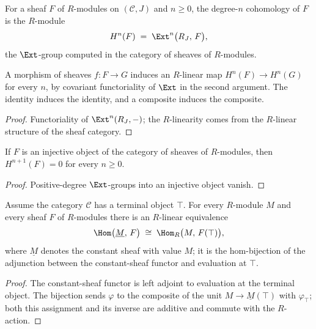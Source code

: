 \begin{definition}
  \label{def:HModule}
  \leanok
  For a sheaf \(F\) of \(R\)-modules on \((\mathcal C, J)\) and \(n \ge 0\), the degree-\(n\)
  cohomology of \(F\) is the \(R\)-module
  \[
    H^n(F) \;=\; \Ext^n\bigl(R_J,\, F\bigr),
  \]
  the \(\Ext\)-group computed in the category of sheaves of \(R\)-modules.
\end{definition}

\begin{definition}[Functoriality]
  \label{def:HModule_map}
  \leanok
  A morphism of sheaves \(f : F \to G\) induces an \(R\)-linear map
  \(H^n(F) \to H^n(G)\) for every \(n\), by covariant functoriality of \(\Ext\) in the second
  argument. The identity induces the identity, and a composite induces the composite.
\end{definition}
\begin{proof}
  \leanok
  Functoriality of \(\Ext^n(R_J, -)\); the \(R\)-linearity comes from the \(R\)-linear
  structure of the sheaf category.
\end{proof}

\begin{lemma}
  \label{lem:HModule_injective_vanishing}
  \leanok
  If \(F\) is an injective object of the category of sheaves of \(R\)-modules, then
  \(H^{n+1}(F) = 0\) for every \(n \ge 0\).
\end{lemma}
\begin{proof}
  \leanok
  Positive-degree \(\Ext\)-groups into an injective object vanish.
\end{proof}

\begin{definition}
  \label{def:constAdjHomEquiv}
  \leanok
  Assume the category \(\mathcal C\) has a terminal object \(\top\). For every \(R\)-module
  \(M\) and every sheaf \(F\) of \(R\)-modules there is an \(R\)-linear equivalence
  \[
    \Hom\bigl(\underline{M},\, F\bigr) \;\cong\; \Hom_R\bigl(M,\, F(\top)\bigr),
  \]
  where \(\underline{M}\) denotes the constant sheaf with value \(M\); it is the hom-bijection
  of the adjunction between the constant-sheaf functor and evaluation at \(\top\).
\end{definition}
\begin{proof}
  \leanok
  The constant-sheaf functor is left adjoint to evaluation at the terminal object. The
  bijection sends \(\varphi\) to the composite of the unit \(M \to \underline{M}(\top)\) with
  \(\varphi_\top\); both this assignment and its inverse are additive and commute with the
  \(R\)-action.
\end{proof}

